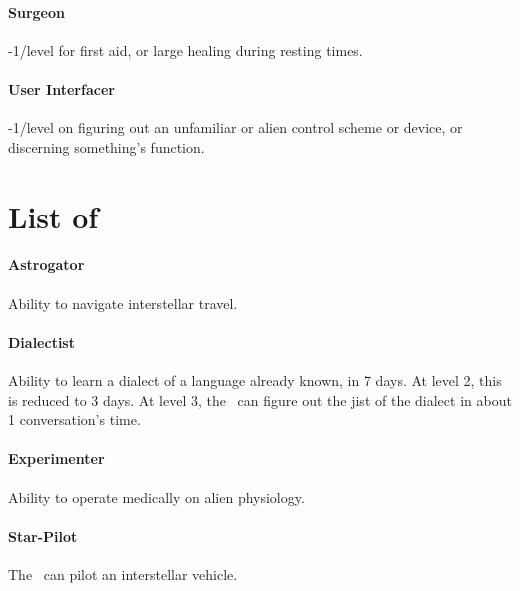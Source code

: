 \paragraph{Surgeon}
\hypertarget{SkillSurgeon}{}
-1/level for first aid, or large healing during resting times.

\paragraph{User Interfacer}
\hypertarget{SkillUserInterfacer}{}
-1/level on figuring out an unfamiliar or alien control scheme or device, or discerning something's function.

\section{List of \abilityPC}
\hypertarget{abilities}{}

\paragraph{Astrogator}
\hypertarget{SkillAstrogator}{}
Ability to navigate interstellar travel.

\paragraph{Dialectist}
\hypertarget{SkillDialectist}{}
Ability to learn a dialect of a language already known, in 7 days. At level 2, this is reduced to 3 days. At level 3, the \pc\, can figure out the jist of the dialect in about 1 conversation's time.

\paragraph{Experimenter}
\hypertarget{SkillExperimenter}{}
Ability to operate medically on alien physiology.

\paragraph{Star-Pilot}
\hypertarget{SkillStar-Pilot}{}
The \pc\, can pilot an interstellar vehicle.